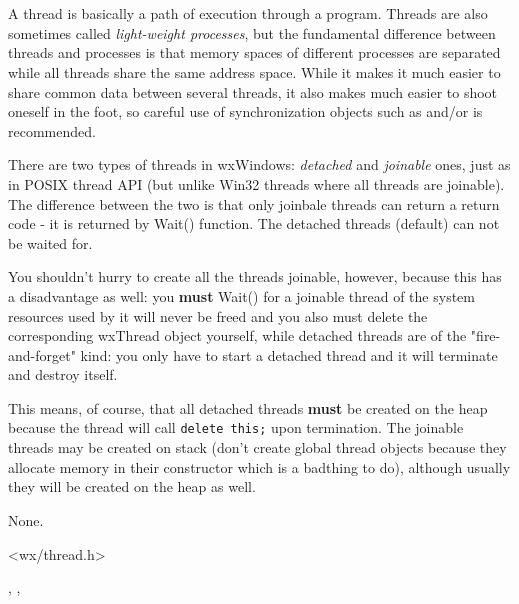 \section{}\label{wxthread}

A thread is basically a path of execution through a program. Threads are also
sometimes called {\it light-weight processes}, but the fundamental difference
between threads and processes is that memory spaces of different processes are
separated while all threads share the same address space. While it makes it
much easier to share common data between several threads, it also makes much
easier to shoot oneself in the foot, so careful use of synchronization objects
such as  and/or  is recommended.

There are two types of threads in wxWindows: {\it detached} and {\it joinable}
ones, just as in POSIX thread API (but unlike Win32 threads where all threads
are joinable). The difference between the two is that only joinbale threads
can return a return code - it is returned by Wait() function. The detached
threads (default) can not be waited for.

You shouldn't hurry to create all the threads joinable, however, because this
has a disadvantage as well: you {\bf must} Wait() for a joinable thread of the
system resources used by it will never be freed and you also must delete the
corresponding wxThread object yourself, while detached threads are of the
"fire-and-forget" kind: you only have to start a detached thread and it will
terminate and destroy itself.

This means, of course, that all detached threads {\bf must} be created on the
heap because the thread will call {\tt delete this;} upon termination. The
joinable threads may be created on stack (don't create global thread objects
because they allocate memory in their constructor which is a badthing to do),
although usually they will be created on the heap as well.


None.


<wx/thread.h>


, , 


